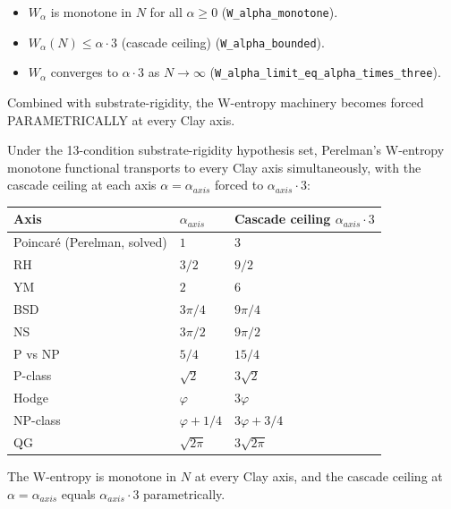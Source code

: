 \begin{itemize}
\setlength{\itemsep}{0pt}
\item $W_\alpha$ is monotone in $N$ for all $\alpha \ge 0$
(\texttt{W\_alpha\_monotone}).
\item $W_\alpha(N) \le \alpha \cdot 3$ (cascade ceiling)
(\texttt{W\_alpha\_bounded}).
\item $W_\alpha$ converges to $\alpha \cdot 3$ as $N \to \infty$
(\texttt{W\_\allowbreak{}alpha\_\allowbreak{}limit\_\allowbreak{}eq\_\allowbreak{}alpha\_\allowbreak{}times\_\allowbreak{}three}).
\end{itemize}

Combined with substrate-rigidity, the W-entropy machinery becomes
forced PARAMETRICALLY at every Clay axis.

\begin{theorem}
\label{thm:perelman-w-entropy-scaling}
Under the 13-condition substrate-rigidity hypothesis set, Perelman's
W-entropy monotone functional transports to every Clay axis
simultaneously, with the cascade ceiling at each axis $\alpha = \alpha_{axis}$
forced to $\alpha_{axis} \cdot 3$:

\begin{center}
\renewcommand{\arraystretch}{1.15}
\begin{tabular}{lll}
\toprule
\textbf{Axis} & $\alpha_{axis}$ & \textbf{Cascade ceiling} $\alpha_{axis} \cdot 3$ \\
\midrule
Poincaré (Perelman, solved) & $1$ & $3$ \\
RH & $3/2$ & $9/2$ \\
YM & $2$ & $6$ \\
BSD & $3\pi/4$ & $9\pi/4$ \\
NS & $3\pi/2$ & $9\pi/2$ \\
P vs NP & $5/4$ & $15/4$ \\
P-class & $\sqrt{2}$ & $3\sqrt{2}$ \\
Hodge & $\varphi$ & $3\varphi$ \\
NP-class & $\varphi + 1/4$ & $3\varphi + 3/4$ \\
QG & $\sqrt{2\pi}$ & $3\sqrt{2\pi}$ \\
\bottomrule
\end{tabular}
\end{center}

The W-entropy is monotone in $N$ at every Clay axis, and the cascade
ceiling at $\alpha = \alpha_{axis}$ equals $\alpha_{axis} \cdot 3$
parametrically.
\end{theorem}

